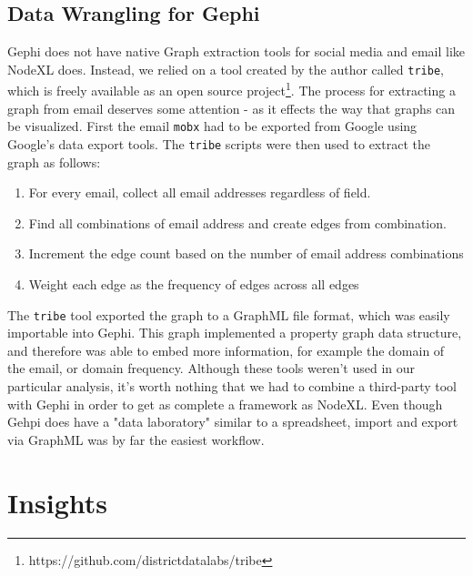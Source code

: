 \documentclass[11pt,letterpaper]{article}
\begin{document}
\subsection*{Data Wrangling for Gephi}

Gephi does not have native Graph extraction tools for social media and email like NodeXL does. Instead, we relied on a tool created by the author called \texttt{tribe}, which is freely available as an open source project\footnote{https://github.com/districtdatalabs/tribe}. The process for extracting a graph from email deserves some attention - as it effects the way that graphs can be visualized. First the email \texttt{mobx} had to be exported from Google using Google's data export tools. The \texttt{tribe} scripts were then used to extract the graph as follows:

\begin{enumerate}
    \item For every email, collect all email addresses regardless of field.
    \item Find all combinations of email address and create edges from combination.
    \item Increment the edge count based on the number of email address combinations
    \item Weight each edge as the frequency of edges across all edges
\end{enumerate}

The \texttt{tribe} tool exported the graph to a GraphML file format, which was easily importable into Gephi. This graph implemented a property graph data structure, and therefore was able to embed more information, for example the domain of the email, or domain frequency. Although these tools weren't used in our particular analysis, it's worth nothing that we had to combine a third-party tool with Gephi in order to get as complete a framework as NodeXL. Even though Gehpi does have a "data laboratory" similar to a spreadsheet, import and export via GraphML was by far the easiest workflow.

\section*{Insights}


\end{document}
